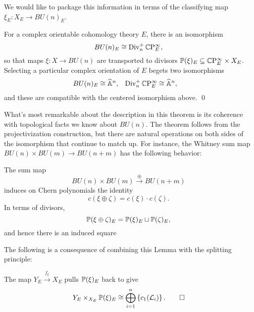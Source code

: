 We would like to package this information in terms of the classifying map $\xi_E: X_E \to BU(n)_E$.
\begin{theorem}
For a complex orientable cohomology theory $E$, there is an isomorphism \[BU(n)_E \cong \Div_n^+ \CP^\infty_E,\] so that maps $\xi: X \to BU(n)$ are transported to divisors $\P(\xi)_E \subseteq \CP^\infty_E \times X_E$.  Selecting a particular complex orientation of $E$ begets two isomorphisms
\begin{align*}
BU(n)_E & \cong \A^n, &
\Div_n^+ \CP^\infty_E & \cong \A^n,
\end{align*}
and these are compatible with the centered isomorphism above. \qed
\end{theorem}

What's most remarkable about the description in this theorem is its coherence with topological facts we know about $BU(n)$.  The theorem follows from the projectivization construction, but there are natural operations on both sides of the isomorphism that continue to match up.  For instance, the Whitney sum map $BU(n) \times BU(m) \to BU(n+m)$ has the following behavior:

\begin{lemma}\label{WhitneySumOfDivisors}
The sum map \[BU(n) \times BU(m) \xrightarrow\oplus BU(n+m)\] induces on Chern polynomials the identity \[c(\xi \oplus \zeta) = c(\xi) \cdot c(\zeta).\]  In terms of divisors, \[\P(\xi \oplus \zeta)_E = \P(\xi)_E \sqcup \P(\zeta)_E,\] and hence there is an induced square
\begin{center}
\end{center}
\end{lemma}

The following is a consequence of combining this Lemma with the splitting principle:

\begin{corollary}
The map $Y_E \xrightarrow{f_\xi} X_E$ pulls $\P(\xi)_E$ back to give \[Y_E \times_{X_E} \P(\xi)_E \cong \bigoplus_{i=1}^n \left\{ c_1(\L_i) \right\}. \qed\]
\end{corollary}

